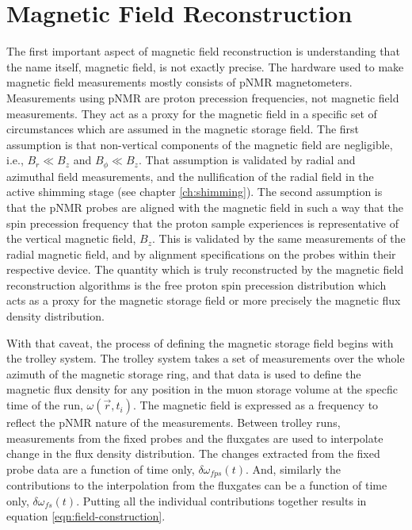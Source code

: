 \section{Magnetic Field Reconstruction}
The first important aspect of magnetic field reconstruction is understanding that the name itself, magnetic field, is not exactly precise.  The hardware used to make magnetic field measurements mostly consists of pNMR magnetometers.  Measurements using pNMR are proton precession frequencies, not magnetic field measurements.  They act as a proxy for the magnetic field in a specific set of circumstances which are assumed in the \mugmtwo magnetic storage field.  The first assumption is that non-vertical components of the magnetic field are negligible, i.e., $B_r \ll B_z$ and $B_\phi \ll B_z$.  That assumption is validated by radial and azimuthal field measurements, and the nullification of the radial field in the active shimming stage (see chapter \ref{ch:shimming}).  The second assumption is that the pNMR probes are aligned with the magnetic field in such a way that the spin precession frequency that the proton sample experiences is representative of the vertical magnetic field, $B_z$.  This is validated by the same measurements of the radial magnetic field, and by alignment specifications on the probes within their respective device.  The quantity which is truly reconstructed by the magnetic field reconstruction algorithms is the free proton spin precession distribution which acts as a proxy for the magnetic storage field or more precisely the magnetic flux density distribution.

With that caveat, the process of defining the \gmtwo magnetic storage field begins with the trolley system.  The trolley system takes a set of measurements over the whole azimuth of the magnetic storage ring, and that data is used to define the magnetic flux density for any position in the muon storage volume at the specfic time of the run, $\omega(\vec{r}, t_i)$. The magnetic field is expressed as a frequency to reflect the pNMR nature of the measurements.  Between trolley runs, measurements from the fixed probes and the fluxgates are used to interpolate change in the flux density distribution.  The changes extracted from the fixed probe data are a function of time only, $\delta \omega_{fps}(t)$.  And, similarly the contributions to the interpolation from the fluxgates can be a function of time only, $\delta \omega_{fs}(t)$.  Putting all the individual contributions together results in equation \ref{eqn:field-construction}.

